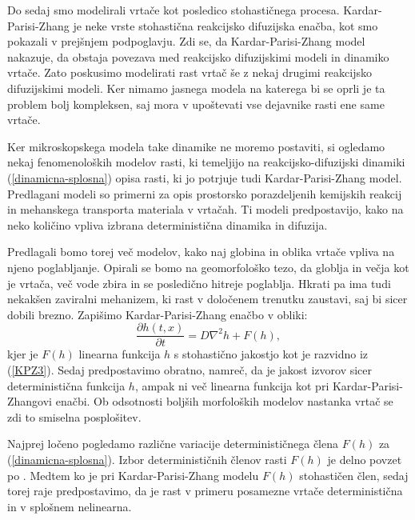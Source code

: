 \documentclass[a4paper, twoside, 12pt]{book}
\begin{document}
Do sedaj smo modelirali vrtače kot posledico stohastičnega procesa. Kardar-Parisi-Zhang je neke vrste stohastična reakcijsko difuzijska enačba, kot smo pokazali v prejšnjem podpoglavju. Zdi se, da Kardar-Parisi-Zhang model nakazuje, da obstaja povezava med reakcijsko difuzijskimi modeli in dinamiko vrtače. Zato poskusimo modelirati rast vrtač še z nekaj drugimi reakcijsko difuzijskimi modeli. Ker nimamo jasnega modela na katerega bi se oprli je ta problem bolj kompleksen, saj mora v upoštevati vse dejavnike rasti ene same vrtače. 

Ker mikroskopskega modela take dinamike ne moremo postaviti, si ogledamo nekaj fenomenoloških modelov rasti, ki temeljijo na reakcijsko-difuzijski dinamiki (\ref{dinamicna-splosna}) opisa rasti, ki jo potrjuje tudi Kardar-Parisi-Zhang model. Predlagani modeli so primerni za opis prostorsko porazdeljenih kemijskih reakcij in mehanskega transporta materiala v vrtačah. Ti modeli predpostavijo, kako na neko količino vpliva izbrana deterministična dinamika in difuzija.

Predlagali bomo torej več modelov, kako naj globina in oblika vrtače vpliva na njeno poglabljanje. Opirali se bomo na geomorfološko tezo, da globlja in večja kot je vrtača, več vode zbira in se posledično hitreje poglablja. Hkrati pa ima tudi nekakšen zaviralni mehanizem, ki rast v določenem trenutku zaustavi, saj bi sicer dobili brezno.
Zapišimo Kardar-Parisi-Zhang enačbo v obliki:
\begin{equation}
  \frac{ \partial h(t,x) }{ \partial t} = D \nabla^2 h + F(h),
  \label{dinamicna-splosna}
\end{equation}
kjer je $F(h)$ linearna funkcija $h$ s stohastično jakostjo kot je razvidno iz (\ref{KPZ3}). Sedaj predpostavimo obratno, namreč, da je jakost izvorov sicer deterministična funkcija $h$, ampak ni več linearna funkcija kot pri Kardar-Parisi-Zhangovi enačbi. Ob odsotnosti boljših morfoloških modelov nastanka vrtač se zdi to smiselna posplošitev.

Najprej ločeno pogledamo različne variacije determinističnega člena $F(h)$ za (\ref{dinamicna-splosna}). Izbor determinističnih členov rasti $F(h)$ je delno povzet po \cite{kandler2010population}. Medtem ko je pri Kardar-Parisi-Zhang modelu $F(h)$ stohastičen člen, sedaj torej raje predpostavimo, da je rast v primeru posamezne vrtače deterministična in v splošnem nelinearna.

\end{document}

